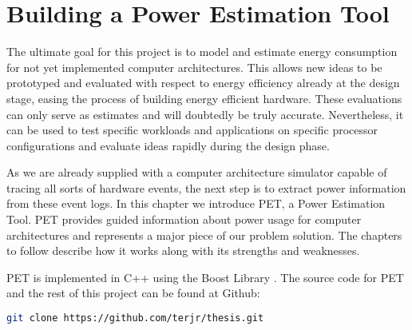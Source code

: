 \chapter{Building a Power Estimation Tool}

The ultimate goal for this project is to model and estimate energy consumption
for not yet implemented computer architectures. This allows new ideas to be
prototyped and evaluated with respect to energy efficiency already at the design
stage, easing the process of building energy efficient hardware. These
evaluations can only serve as estimates and will doubtedly be truly accurate.
Nevertheless, it can be used to test specific workloads and applications on
specific processor configurations and evaluate ideas rapidly during the design
phase.

As we are already supplied with a computer architecture simulator capable of
tracing all sorts of hardware events, the next step is to extract power
information from these event logs. In this chapter we introduce PET, a Power
Estimation Tool. PET provides guided information about power usage for computer
architectures and represents a major piece of our problem solution. The chapters
to follow describe how it works along with its strengths and weaknesses.

\noindent PET is implemented in C++ using the Boost Library \cite{boostwebpage}. The source code for
PET and the rest of this project can be found at Github:

\begin{lstlisting}[language=bash,numbers=none]
git clone https://github.com/terjr/thesis.git
\end{lstlisting}






